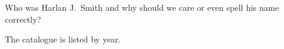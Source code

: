 

Who was Harlan J.~Smith and why should we care or even
spell his name correctly?

The catalogue is listed by year.
